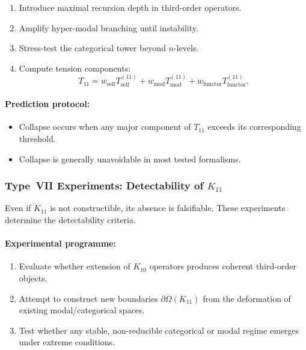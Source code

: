 \begin{enumerate}
    \item Introduce maximal recursion depth in third-order operators.
    \item Amplify hyper-modal branching until instability.
    \item Stress-test the categorical tower beyond $n$-levels.
    \item Compute tension components:
          \[
              T_{11} =
                w_{\mathrm{self}} T_{\mathrm{self}}^{(11)}
              + w_{\mathrm{mod}} T_{\mathrm{mod}}^{(11)}
              + w_{\mathrm{functor}} T_{\mathrm{functor}}^{(11)}.
          \]
\end{enumerate}

\paragraph{Prediction protocol:}

\begin{itemize}
    \item Collapse occurs when any major component of $T_{11}$ exceeds
          its corresponding threshold.
    \item Collapse is generally unavoidable in most tested formalisms.
\end{itemize}



\subsubsection{Type~VII Experiments: Detectability of $K_{11}$}

Even if $K_{11}$ is not constructible, its absence is falsifiable.
These experiments determine the detectability criteria.

\paragraph{Experimental programme:}

\begin{enumerate}
    \item Evaluate whether extension of $K_{10}$ operators produces
          coherent third-order objects.
    \item Attempt to construct new boundaries $\partial\Omega(K_{11})$
          from the deformation of existing modal/categorical spaces.
    \item Test whether any stable, non-reducible categorical or modal
          regime emerges under extreme conditions.
\end{enumerate}

